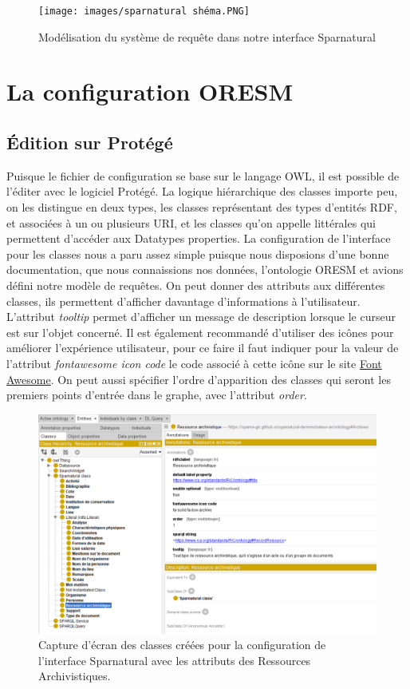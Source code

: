 \begin{figure}[h]
    \centering
    \texttt{[image: images/sparnatural shéma.PNG]}
    \caption{Modélisation du système de requête dans notre interface Sparnatural}
    \label{fig:shéma_sparnatural}
\end{figure}

\section{La configuration ORESM}
\subsection{Édition sur Protégé}
Puisque le fichier de configuration se base sur le langage OWL, il est possible de l'éditer avec le logiciel Protégé. La logique hiérarchique des classes importe peu, on les distingue en deux types, les classes représentant des types d'entités RDF, et associées à un ou plusieurs URI, et les classes qu'on appelle littérales qui permettent d'accéder aux Datatypes properties. La configuration de l'interface pour les classes nous a paru assez simple puisque nous disposions d'une bonne documentation, que nous connaissions nos données, l'ontologie ORESM et avions défini notre modèle de requêtes. On peut donner des attributs aux différentes classes, ils permettent d'afficher davantage d'informations à l'utilisateur. L'attribut \textit{tooltip} permet d'afficher un message de description lorsque le curseur est sur l'objet concerné. Il est également recommandé d'utiliser des icônes pour améliorer l'expérience utilisateur, pour ce faire il faut indiquer pour la valeur de l'attribut \textit{fontawesome icon code} le code associé à cette icône sur le site \href{https://fontawesome.com/}{Font Awesome}. On peut aussi spécifier l'ordre d'apparition des classes qui seront les premiers points d'entrée dans le graphe, avec l'attribut \textit{order}.
\begin{figure}[h]
    \centering
    \includegraphics[width=0.9\linewidth]{images/classes sparnatural.png}
    \caption{Capture d'écran des classes créées pour la configuration de l'interface Sparnatural avec les attributs des Ressources Archivistiques.}
    \label{fig:classes-sparnatural}
\end{figure}

